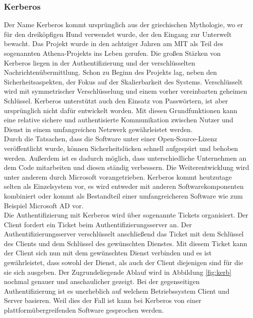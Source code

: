 \documentclass[
book,
a4paper,   
titlepage,  
halfparskip,
12pt        
]{scrartcl}
\begin{document}
\begin{onehalfspacing}
\subsubsection{Kerberos}
Der Name Kerberos kommt ursprünglich aus der griechischen Mythologie, wo er für den dreiköpfigen Hund verwendet wurde, der den Eingang zur Unterwelt bewacht. 
Das Projekt wurde in den achtziger Jahren am \ac{MIT} als Teil des sogenannten Athena-Projekts ins Leben gerufen\cite{athena}. Die großen Stärken von Kerberos liegen in der Authentifizierung und der verschlüsselten Nachrichtenübermittlung. Schon zu Beginn des Projekts lag, neben den Sicherheitsaspekten, der Fokus auf der Skalierbarkeit des Systems. 
Verschlüsselt wird mit symmetrischer Verschlüsselung und einem vorher vereinbarten geheimen Schlüssel. Kerberos unterstützt auch den Einsatz von Passwörtern, ist aber ursprünglich nicht dafür entwickelt worden. 
Mit diesen Grundfunktionen kann eine relative sichere und authentisierte Kommunikation zwischen Nutzer und Dienst in einem umfangreichen Netzwerk gewährleistet werden.\cite[S. 137]{kerberos2}\\
Durch die Tatsachen, dass die Software unter einer Open-Source-Lizenz veröffentlicht wurde, können Sicherheitslücken schnell aufgespürt und behoben werden. Außerdem ist es dadurch möglich, dass unterschiedliche Unternehmen an dem Code mitarbeiten und diesen ständig verbessern. Die Weiterentwicklung wird unter anderem durch Microsoft vorangetrieben. Kerberos kommt heutzutage selten als Einzelsystem vor, es wird entweder mit anderen Softwarekomponenten kombiniert oder kommt als Bestandteil einer umfangreicheren Software wie zum Beispiel Microsoft \ac{AD} vor.\cite[S. 138]{kerberos2}\\
Die Authentifizierung mit Kerberos wird über sogenannte Tickets organisiert. Der Client fordert ein Ticket beim Authentifizierungsserver an. Der Authentifizierungsserver verschlüsselt anschließend das Ticket mit dem Schlüssel des Clients und dem Schlüssel des gewünschten Dienstes. Mit diesem Ticket kann der Client sich nun mit dem gewünschten Dienst verbinden und es ist gewährleistet, dass sowohl der Dienst, als auch der Client diejenigen sind für die sie sich ausgeben.  Der Zugrundeliegende Ablauf wird in Abbildung \vref{fig:kerb} nochmal genauer und anschaulicher gezeigt. Bei der gegenseitigen Authentifizierung ist es unerheblich auf welchem Betriebssystem Client und Server basieren. Weil dies der Fall ist kann bei Kerberos von einer plattformübergreifenden Software gesprochen werden.
\begin{figure}[h]

\end{figure}
\end{onehalfspacing}
\end{document}
